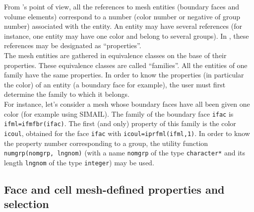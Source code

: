 {{{From \CS 's point of view, all the references to mesh entities (boundary faces
and volume elements) correspond to a number (color number or negative
of group number) associated with the entity. An entity may have several
references (for instance, one entity may have one color and belong to
several groups). In \CS, these references may be designated as
``properties''. \\
The mesh entities are gathered in equivalence classes on the base of
their properties. These equivalence classes are called ``families''. All
the entities of one family have the same properties. In order to know
the properties (in particular the color) of an entity (a boundary face
for example), the user must first determine the family to which it
belongs. \\
For instance, let's consider a mesh whose boundary faces have all been
given one color (for example using SIMAIL). The family of the boundary
face \texttt{ifac} is \texttt{ifml=ifmfbr(ifac)}. The first (and only)
property of this family is the color \texttt{icoul}, obtained for the face
\texttt{ifac} with \texttt{icoul=iprfml(ifml,1)}. In order to know the
property number corresponding to a group, the utility function
\texttt{numgrp(nomgrp, lngnom)} (with a name
\texttt{nomgrp} of the type \texttt{character*} and its length
\texttt{lngnom} of the type \texttt{integer}) may be used.

\subsection{Face and cell mesh-defined properties and selection}
\label{sec:selection_criteria}

}}}
